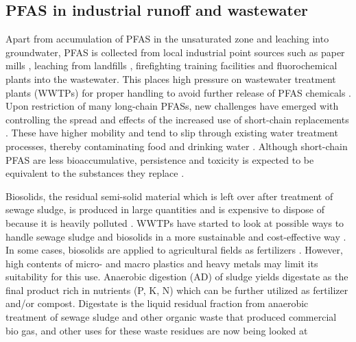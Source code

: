 \subsection{PFAS in industrial runoff and wastewater}
Apart from accumulation of PFAS in the unsaturated zone and leaching into groundwater, PFAS is collected from local industrial point sources such as paper mills \citep{lee2020legacy,langberg2021paper}, leaching from landfills \citep{masoner2020landfill}, firefighting training facilities \citep{MD2016workshop} and fluorochemical plants \citep{gebbink2017presence} into the wastewater. This places high pressure on wastewater treatment plants (WWTPs) for proper handling to avoid further release of PFAS chemicals  \citep{Morin2017flameWaste}. Upon restriction of many long-chain PFASs, new challenges have emerged with controlling the spread and effects of the increased use of short-chain replacements \citep{knutsen2019leachate}. These have higher mobility and tend to slip through existing water treatment processes, thereby contaminating food and drinking water \citep{hale2020persistent,brendel2018short}. Although short-chain PFAS are less bioaccumulative, persistence and toxicity is expected to be equivalent to the substances they replace \citep{EC2020PFAS}. 

Biosolids, the residual semi-solid material which is left over after treatment of sewage sludge, is produced in large quantities and is expensive to dispose of because it is heavily polluted \citep{Raheem2018}. WWTPs have started to look at possible ways to handle sewage sludge and biosolids in a more sustainable and cost-effective way \citep{Raheem2018}. In some cases, biosolids are applied to agricultural fields as fertilizers \citep{moodie2021legacy}. However, high contents of micro- and macro plastics and heavy metals may limit its suitability for this use. Anaerobic digestion (AD) of sludge yields digestate as the final product rich in nutrients (P, K, N) which can be further utilized as fertilizer and/or compost. Digestate is the liquid residual fraction from anaerobic treatment of sewage sludge and other organic waste that produced commercial bio gas, and other uses for these waste residues are now being looked at  


